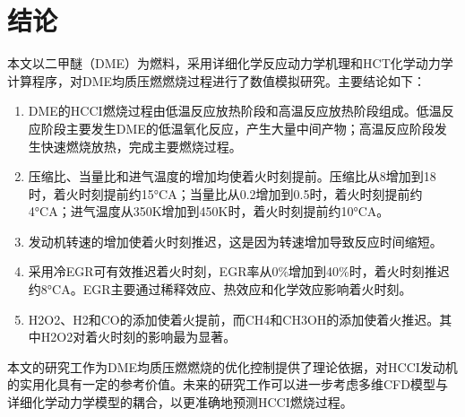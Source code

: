 \chapter{结论}

本文以二甲醚（DME）为燃料，采用详细化学反应动力学机理和HCT化学动力学计算程序，对DME均质压燃燃烧过程进行了数值模拟研究。主要结论如下：

\begin{enumerate}
	\item DME的HCCI燃烧过程由低温反应放热阶段和高温反应放热阶段组成。低温反应阶段主要发生DME的低温氧化反应，产生大量中间产物；高温反应阶段发生快速燃烧放热，完成主要燃烧过程。

	\item 压缩比、当量比和进气温度的增加均使着火时刻提前。压缩比从8增加到18时，着火时刻提前约15°CA；当量比从0.2增加到0.5时，着火时刻提前约4°CA；进气温度从350K增加到450K时，着火时刻提前约10°CA。

	\item 发动机转速的增加使着火时刻推迟，这是因为转速增加导致反应时间缩短。

	\item 采用冷EGR可有效推迟着火时刻，EGR率从0\%增加到40\%时，着火时刻推迟约8°CA。EGR主要通过稀释效应、热效应和化学效应影响着火时刻。

	\item H2O2、H2和CO的添加使着火提前，而CH4和CH3OH的添加使着火推迟。其中H2O2对着火时刻的影响最为显著。
\end{enumerate}

本文的研究工作为DME均质压燃燃烧的优化控制提供了理论依据，对HCCI发动机的实用化具有一定的参考价值。未来的研究工作可以进一步考虑多维CFD模型与详细化学动力学模型的耦合，以更准确地预测HCCI燃烧过程。
